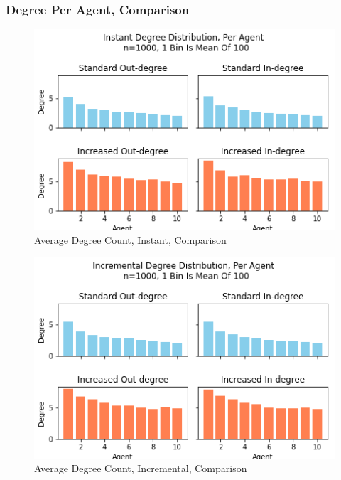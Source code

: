 \documentclass{article}
\begin{document}
\subsubsection{Degree Per Agent, Comparison}
\begin{center}
    \begin{figure}[!htbp]
        \centering
        \includegraphics[width=.8\textwidth]{ThesisKI/Images/ComparisonPerAgentInstant.png}
        \caption{Average Degree Count, Instant, Comparison}
        \label{DPA:InsCom}
    \end{figure}
\end{center}
\begin{center}
    \begin{figure}[!htbp]
        \centering
        \includegraphics[width=.8\textwidth]{ThesisKI/Images/ComparisonPerAgentIncremental.png}
        \caption{Average Degree Count, Incremental, Comparison}
        \label{DPA:IncCom}
    \end{figure}
\end{center}
\newpage
\end{document}
